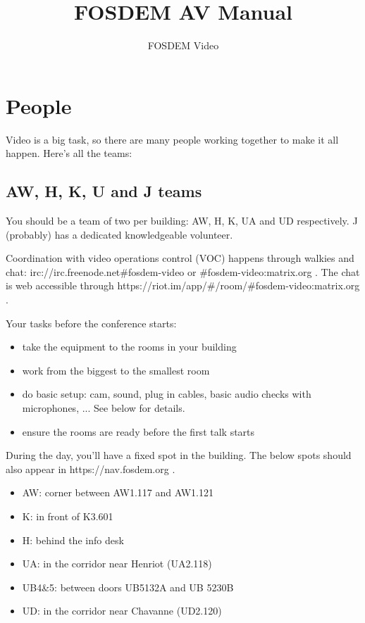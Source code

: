 \documentclass{article}
\title{FOSDEM AV Manual}
\author{FOSDEM Video}
\begin{document}
\maketitle \thispagestyle{empty}
\newpage

\tableofcontents
\newpage

\section{People}
Video is a big task, so there are many people working together to make it all happen. Here's all the teams:

\subsection{AW, H, K, U and J teams}
You should be a team of two per building: AW, H, K, UA and UD respectively. J (probably) has a dedicated knowledgeable volunteer.

Coordination with video operations control (VOC) happens through walkies and chat: irc://irc.freenode.net\#fosdem-video or \#fosdem-video:matrix.org . The chat is web accessible through https://riot.im/app/\#/room/\#fosdem-video:matrix.org .

Your tasks before the conference starts:
\begin{itemize}
  \item take the equipment to the rooms in your building
  \item work from the biggest to the smallest room
  \item do basic setup: cam, sound, plug in cables, basic audio checks with microphones, ... See below for details.
  \item ensure the rooms are ready before the first talk starts
\end{itemize}

During the day, you'll have a fixed spot in the building. The below spots should also appear in https://nav.fosdem.org .
\begin{itemize}
  \item AW: corner between AW1.117 and AW1.121
  \item K: in front of K3.601
  \item H: behind the info desk
  \item UA: in the corridor near Henriot (UA2.118)
  \item UB4\&5: between doors UB5132A and UB 5230B
  \item UD: in the corridor near Chavanne (UD2.120)
\end{itemize}
\end{document}
